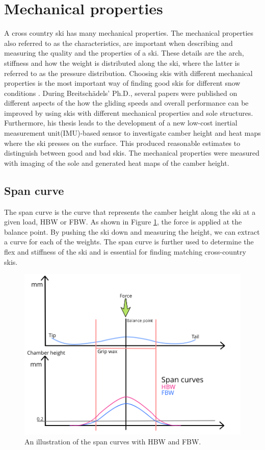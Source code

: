 \section{Mechanical properties}
\label{sec:mechanicalproperties}
A cross country ski has many mechanical properties. The mechanical properties also referred to as the characteristics, are important when describing and measuring the quality and the properties of a ski. These details are the arch, stiffness and how the weight is distributed along the ski, where the latter is referred to as the pressure distribution. Choosing skis with different mechanical properties is the most important way of finding good skis for different snow conditions  \citep{breitschadel_technical_2014}. During Breitschädels' Ph.D., several papers were published on different aspects of the how the gliding speeds and overall performance can be improved by using skis with different mechanical properties and sole structures. Furthermore, his thesis leads to the development of a new low-cost inertial measurement unit(IMU)-based sensor to investigate camber height and heat maps where the ski presses on the surface. This produced reasonable estimates to distinguish between good and bad skis. The mechanical properties were measured with imaging of the sole and generated heat maps of the camber height. 
\newline

\subsection{Span curve}
\label{subsec:spancurve}
The span curve is the curve that represents the camber height along the ski at a given load, HBW or FBW. As shown in Figure \ref{fig:spancurve}, the force is applied at the balance point. By pushing the ski down and measuring the height, we can extract a curve for each of the weights. The span curve is further used to determine the flex and stiffness of the ski and is essential for finding matching cross-country skis.

\begin{figure}
    \centering
    \includegraphics[width=1\textwidth]{figures/spancurve.png}
    \caption{An illustration of the span curves with HBW and FBW.}
    \label{fig:spancurve}
\end{figure}

